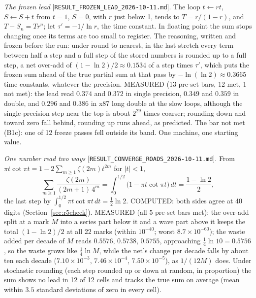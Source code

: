 \documentclass[11pt]{article}
\newcommand{\rec}[1]{\nolinkurl{#1}}
\begin{document}
\medskip
\noindent\emph{The frozen lead} [\rec{RESULT_FROZEN_LEAD_2026-10-11.md}]. The loop $t\leftarrow rt$, $S\leftarrow S+t$ from $t=1$, $S=0$, with $r$ just below 1, tends to $T=r/(1-r)$, and $T-S_n=Tr^n$; let $\tau'=-1/\ln r$, the time constant. In floating point the sum stops changing once its terms are too small to register. The reasoning, written and frozen before the run: under round to nearest, in the last stretch every term between half a step and a full step of the stored numbers is rounded up to a full step, a net over-add of $(1-\ln2)/2\approx0.1534$ of a step times $\tau'$, which puts the frozen sum ahead of the true partial sum at that pass by $-\ln(\ln2)\approx0.3665$ time constants, whatever the precision. MEASURED (13 pre-set bars, 12 met, 1 not met): the lead read $0.374$ and $0.372$ in single precision, $0.349$ and $0.359$ in double, and $0.296$ and $0.386$ in x87 long double at the slow loops, although the single-precision step near the top is about $2^{29}$ times coarser; rounding down and toward zero fall behind, rounding up runs ahead, as predicted. The bar not met (B1c): one of 12 freeze passes fell outside its band. One machine, one starting value.

\medskip
\noindent\emph{One number read two ways} [\rec{RESULT_CONVERGE_ROADS_2026-10-11.md}]. From $\pi t\cot\pi t=1-2\sum_{m\ge1}\zeta(2m)t^{2m}$ for $|t|<1$,
\[
\sum_{m\ge1}\frac{\zeta(2m)}{(2m+1)\,4^m}=\int_0^{1/2}\bigl(1-\pi t\cot\pi t\bigr)\,dt=\frac{1-\ln2}{2},
\]
the last step by $\int_0^{1/2}\pi t\cot\pi t\,dt=\frac12\ln2$. COMPUTED: both sides agree at 40 digits (Section~\ref{sec:r5check}). MEASURED (all 5 pre-set bars met): the over-add split at a mark $M$ into a series part below it and a wave part above it keeps the total $(1-\ln2)/2$ at all 22 marks (within $10^{-40}$; worst $8.7\times10^{-60}$); the waste added per decade of $M$ reads $0.5576$, $0.5738$, $0.5755$, approaching $\frac14\ln10=0.5756$, so the waste grows like $\frac14\ln M$, while the net's change per decade falls by about ten each decade ($7.10\times10^{-3}$, $7.46\times10^{-4}$, $7.50\times10^{-5}$), as $1/(12M)$ does. Under stochastic rounding (each step rounded up or down at random, in proportion) the sum shows no lead in 12 of 12 cells and tracks the true sum on average (mean within $3.5$ standard deviations of zero in every cell).
\end{document}
